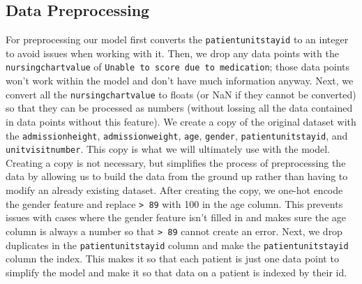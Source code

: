 \documentclass{article}
\begin{document}
\subsection{Data Preprocessing}

For preprocessing our model first converts the \texttt{patientunitstayid} to an integer to avoid issues when working with it. Then, we drop any data points with the \texttt{nursingchartvalue} of \texttt{Unable to score due to medication}; those data points won't work within the model and don't have much information anyway. Next, we convert all the \texttt{nursingchartvalue} to floats (or NaN if they cannot be converted) so that they can be processed as numbers (without lossing all the data contained in data points without this feature). We create a copy of the original dataset with the \texttt{admissionheight}, \texttt{admissionweight}, \texttt{age}, \texttt{gender}, \texttt{patientunitstayid}, and \texttt{unitvisitnumber}. This copy is what we will ultimately use with the model. Creating a copy is not necessary, but simplifies the process of preprocessing the data by allowing us to build the data from the ground up rather than having to modify an already existing dataset. After creating the copy, we one-hot encode the gender feature and replace \texttt{> 89} with 100 in the age column. This prevents issues with cases where the gender feature isn't filled in and makes sure the age column is always a number so that \texttt{> 89} cannot create an error. Next, we drop duplicates in the \texttt{patientunitstayid} column and make the \texttt{patientunitstayid} column the index. This makes it so that each patient is just one data point to simplify the model and make it so that data on a patient is indexed by their id. 
\end{document}
